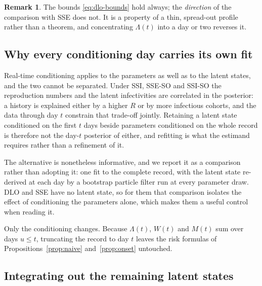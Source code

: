 \documentclass[11pt,a4paper]{article}
\theoremstyle{plain}
\theoremstyle{definition}
\newtheorem*{remark}{Remark}
\newcommand{\dlo}{DLO}
\newcommand{\sse}{SSE}
\newcommand{\ssi}{SSI}
\newcommand{\sseso}{SSE-SO}
\newcommand{\ssiso}{SSI-SO}
\begin{document}
\begin{remark}
The bounds \eqref{eq:dlo-bounds} hold always; the \emph{direction} of the comparison with \sse{}
does not. It is a property of a thin, spread-out profile rather than a theorem, and concentrating
$\Lambda(t)$ into a day or two reverses it.
\end{remark}

\subsection{Why every conditioning day carries its own fit}
\label{sec:smoothing}

Real-time conditioning applies to the parameters as well as to the latent states, and the two
cannot be separated. Under \ssi{}, \sseso{} and \ssiso{} the reproduction numbers and the latent
infectivities are correlated in the posterior: a history is explained either by a higher $R$ or
by more infectious cohorts, and the data through day $t$ constrain that trade-off jointly.
Retaining a latent state conditioned on the first $t$ days beside parameters conditioned on the
whole record is therefore not the day-$t$ posterior of either, and refitting is what the estimand
requires rather than a refinement of it.

The alternative is nonetheless informative, and we report it as a comparison rather than adopting
it: one fit to the complete record, with the latent state re-derived at each day by a bootstrap
particle filter run at every parameter draw. \dlo{} and \sse{} have no latent state, so for them
that comparison isolates the effect of conditioning the parameters alone, which makes them a
useful control when reading it.

Only the conditioning changes. Because $\Lambda(t)$, $W(t)$ and $M(t)$ sum over days $u\le t$,
truncating the record to day $t$ leaves the risk formulas of Propositions~\ref{prop:naive}
and~\ref{prop:onset} untouched.

\subsection{Integrating out the remaining latent states}
\label{sec:reconstruction}
\end{document}
